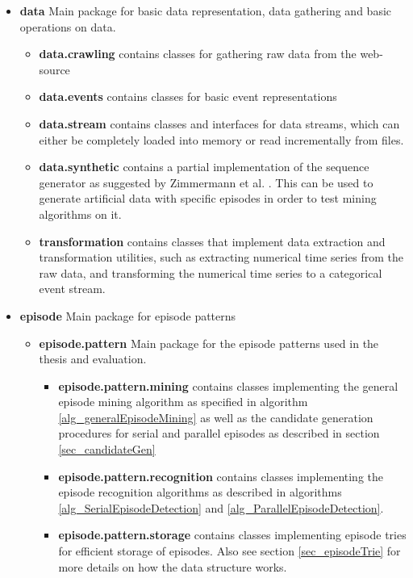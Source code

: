 \begin{itemize}
	\item \textbf{data} Main package for basic data representation, data gathering and basic operations on data.
	\begin{itemize}
		\item \textbf{data.crawling} contains classes for gathering raw data from the web-source
		\item \textbf{data.events} contains classes for basic event representations
		\item \textbf{data.stream} contains classes and interfaces for data streams, which can either be completely loaded into memory or read incrementally from files.
		\item \textbf{data.synthetic} contains a partial implementation of the sequence generator as suggested by Zimmermann et al. \cite{zimmermann2012generating}. This can be used to generate artificial data with specific episodes in order to test mining algorithms on it.
		\item \textbf{transformation} contains classes that implement data extraction and transformation utilities, such as extracting numerical time series from the raw data, and transforming the numerical time series to a categorical event stream.
	\end{itemize}
	\item \textbf{episode} Main package for episode patterns
	\begin{itemize}
		\item \textbf{episode.pattern} Main package for the episode patterns used in the thesis and evaluation.
		\begin{itemize}
			\item \textbf{episode.pattern.mining} contains classes implementing the general episode mining algorithm as specified in algorithm \ref{alg_generalEpisodeMining} as well as the candidate generation procedures for serial and parallel episodes as described in section \ref{sec_candidateGen}
			\item \textbf{episode.pattern.recognition} contains classes implementing the episode recognition algorithms as described in algorithms \ref{alg_SerialEpisodeDetection} and \ref{alg_ParallelEpisodeDetection}.
			\item \textbf{episode.pattern.storage} contains classes implementing episode tries for efficient storage of episodes. Also see section \ref{sec_episodeTrie} for more details on how the data structure works.
		\end{itemize}

\end{itemize}
\end{itemize}
